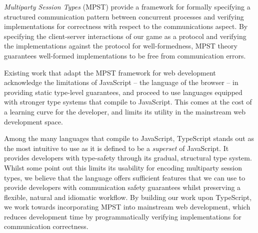\textit{Multiparty Session Types} (MPST) \cite{MPST} provide 
a framework for formally specifying a structured communication pattern 
between concurrent processes and verifying implementations for 
correctness with respect to the communications aspect. 
By specifying the client-server interactions of our game as a protocol 
and verifying the implementations against the protocol for well-formedness, 
MPST theory guarantees well-formed implementations to be 
free from communication errors.

Existing work \cite{MVU2020,PureScript2019} that 
adapt the MPST framework for web development
acknowledge the limitations of JavaScript -- the language of the browser --
in providing static type-level guarantees, and proceed to use
languages equipped with stronger type systems that compile to JavaScript.
This comes at the cost of a learning curve for the developer,
and limits its utility in the mainstream web development space.

Among the many languages that compile to JavaScript,
TypeScript stands out as the most intuitive to use as it is defined
to be a \textit{superset} of JavaScript. It provides developers
with type-safety through its gradual, structural type system.
Whilst some \cite{MVU2020} point out this limits its usability for
encoding multiparty session types, we believe that the language
offers sufficient features that we can use to provide developers with
communication safety guarantees whilst preserving a flexible, natural
and idiomatic workflow. By building our work upon TypeScript, we
work towards incorporating MPST into mainstream web development,
which reduces development time by programmatically verifying 
implementations for communication correctness.